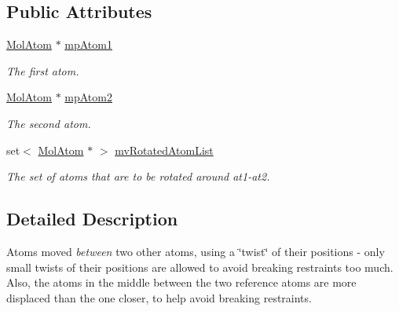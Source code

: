 \subsection*{Public Attributes}
\begin{DoxyCompactItemize}
\item 
\mbox{\label{struct_obj_cryst_1_1_stretch_mode_twist_ad744e9f68b07367752ed7c03d381a30c}} 
\mbox{\hyperlink{class_obj_cryst_1_1_mol_atom}{Mol\+Atom}} $\ast$ \mbox{\hyperlink{struct_obj_cryst_1_1_stretch_mode_twist_ad744e9f68b07367752ed7c03d381a30c}{mp\+Atom1}}
\begin{DoxyCompactList}\small\item\em The first atom. \end{DoxyCompactList}\item 
\mbox{\label{struct_obj_cryst_1_1_stretch_mode_twist_a36180a825c130a18a59c6cfe1a44398c}} 
\mbox{\hyperlink{class_obj_cryst_1_1_mol_atom}{Mol\+Atom}} $\ast$ \mbox{\hyperlink{struct_obj_cryst_1_1_stretch_mode_twist_a36180a825c130a18a59c6cfe1a44398c}{mp\+Atom2}}
\begin{DoxyCompactList}\small\item\em The second atom. \end{DoxyCompactList}\item 
\mbox{\label{struct_obj_cryst_1_1_stretch_mode_twist_a5b3c7f8a0bf81c04ca39fcc88e596f22}} 
set$<$ \mbox{\hyperlink{class_obj_cryst_1_1_mol_atom}{Mol\+Atom}} $\ast$ $>$ \mbox{\hyperlink{struct_obj_cryst_1_1_stretch_mode_twist_a5b3c7f8a0bf81c04ca39fcc88e596f22}{mv\+Rotated\+Atom\+List}}
\begin{DoxyCompactList}\small\item\em The set of atoms that are to be rotated around at1-\/at2. \end{DoxyCompactList}\end{DoxyCompactItemize}


\subsection{Detailed Description}
Atoms moved {\itshape between} two other atoms, using a \char`\"{}twist\char`\"{} of their positions -\/ only small twists of their positions are allowed to avoid breaking restraints too much. Also, the atoms in the middle between the two reference atoms are more displaced than the one closer, to help avoid breaking restraints. 

